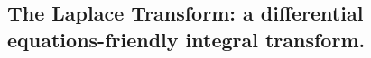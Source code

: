 \documentclass[letterpaper,12pt]{report}
\providecommand{\tightlist}{%
  \setlength{\itemsep}{0pt}\setlength{\parskip}{0pt}}
\begin{document}
\subsection{The Laplace Transform: a differential equations-friendly integral transform.}









\end{document}
